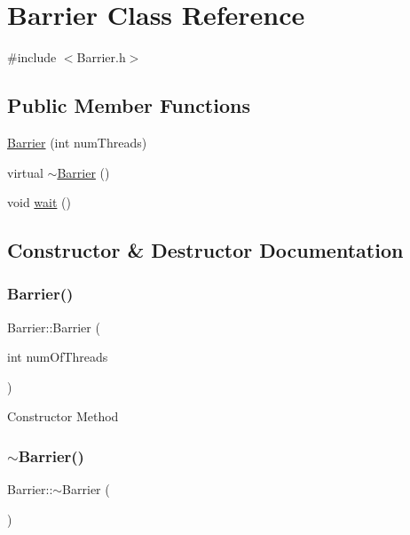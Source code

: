 \hypertarget{class_barrier}{}\section{Barrier Class Reference}
\label{class_barrier}


{\ttfamily \#include $<$Barrier.\+h$>$}

\subsection*{Public Member Functions}
\begin{DoxyCompactItemize}
\item 
\hyperlink{class_barrier_a7290fb8952d0f7779b8d6a7a34bbd407}{Barrier} (int num\+Threads)
\item 
virtual \hyperlink{class_barrier_a401f40e73302009b305904ffc7825304}{$\sim$\+Barrier} ()
\item 
void \hyperlink{class_barrier_a83a9d2e85e98b3d2081538bf0da29b60}{wait} ()
\end{DoxyCompactItemize}


\subsection{Constructor \& Destructor Documentation}
\mbox{\label{class_barrier_a7290fb8952d0f7779b8d6a7a34bbd407}} 
\subsubsection{\texorpdfstring{Barrier()}{Barrier()}}
{\footnotesize\ttfamily Barrier\+::\+Barrier (\begin{DoxyParamCaption}\item[{int}]{num\+Of\+Threads }\end{DoxyParamCaption})}

Constructor Method \mbox{\label{class_barrier_a401f40e73302009b305904ffc7825304}} 
\subsubsection{\texorpdfstring{$\sim$\+Barrier()}{~Barrier()}}
{\footnotesize\ttfamily Barrier\+::$\sim$\+Barrier (\begin{DoxyParamCaption}{ }\end{DoxyParamCaption})\hspace{0.3cm}{\ttfamily [virtual]}}

